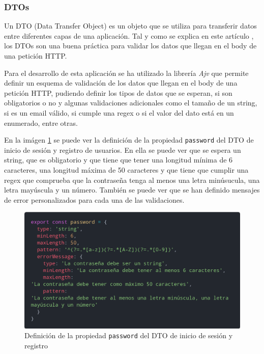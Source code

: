 \subsubsection{DTOs} \label{sssec:DTOs}
Un DTO (Data Transfer Object) es un objeto que se utiliza para transferir datos entre
diferentes capas de una aplicación. Tal y como se explica en este artículo \cite{dto-validation},
los DTOs son una buena práctica para validar los datos que llegan en el body de una petición
HTTP.

Para el desarrollo de esta aplicación se ha utilizado la librería \textit{Ajv} \cite{ajv}
que permite definir un esquema de validación de los datos que llegan en el body de una
petición HTTP, pudiendo definir los tipos de datos que se esperan, si son obligatorios o
no y algunas validaciones adicionales como el tamaño de un string, si es un email válido,
si cumple una regex o si el valor del dato está en un enumerado, entre otras.

En la imágen \ref{fig:password-dto} se puede ver la definición de la propiedad
\texttt{password} del DTO de inicio de sesión y registro de usuarios. En ella se puede
ver que se espera un string, que es obligatorio y que tiene que tener una longitud mínima
de 6 caracteres, una longitud máxima de 50 caracteres y que tiene que cumplir una regex
que comprueba que la contraseña tenga al menos una letra minúsucula, una letra mayúscula y
un número. También se puede ver que se han definido mensajes de error personalizados para
cada una de las validaciones.

\begin{figure}[H]
  \centering
  \includegraphics[width=1\textwidth]{img/password-dto}
  \caption{Definición de la propiedad \texttt{password} del DTO de inicio de sesión y registro}
  \label{fig:password-dto}
\end{figure}

